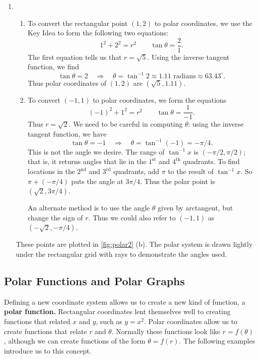 {\begin{enumerate}
	\item \begin{enumerate}
		\item To convert the rectangular point $(1,2)$ to polar coordinates, we use the Key Idea to form the following two equations:
		$$1^2+2^2 = r^2 \qquad \tan \theta = \frac{2}{1}.$$
		The first equation tells us that $r=\sqrt{5}$. Using the inverse tangent function, we find
		$$\tan \theta = 2 \quad \Rightarrow \quad \theta = \tan^{-1} 2 \approx 1.11\text{ radians}\approx 63.43^\circ.$$
		Thus polar coordinates of $(1,2)$ are $(\sqrt{5},1.11)$.
		\item		To convert $(-1,1)$ to polar coordinates, we form the equations 
		$$(-1)^2+1^2=r^2 \qquad \tan \theta = \frac{1}{-1}.$$
		Thus $r=\sqrt{2}$. We need to be careful in computing $\theta$: using the inverse tangent function, we have $$\tan\theta = -1 \quad \Rightarrow \quad \theta = \tan^{-1}(-1) = -\pi/4.$$
		This is not the angle we desire. The range of $\tan^{-1}x $ is $(-\pi/2,\pi/2)$; that is, it returns angles that lie in the $1^\text{st}$ and $4^\text{th}$ quadrants. To find locations in the $2^\text{nd}$  and $3^\text{rd}$ quadrants, add $\pi$ to the result of $\tan^{-1}x$. So  $\pi+(-\pi/4)$ puts the angle at $3\pi/4$. Thus the polar point is $(\sqrt{2},3\pi/4)$.
		
		An alternate method is to use the angle $\theta$ given by arctangent, but change the sign of $r$. Thus we could also refer to $(-1,1)$ as\\ $(-\sqrt{2},-\pi/4)$.
	\end{enumerate}
These points are plotted in \autoref{fig:polar2} (b). The polar system is drawn lightly under the rectangular grid with rays to demonstrate the angles used.\eoehere
\end{enumerate}}

\subsection*{Polar Functions and Polar Graphs}

Defining a new coordinate system allows us to create a new kind of function, a \textbf{polar function.} Rectangular coordinates lent themselves well to creating functions that related $x$ and $y$, such as $y=x^2.$ Polar coordinates allow us to create functions that relate $r$ and $\theta$. Normally these functions look like $r=f(\theta)$, although we can create functions of the form $\theta = f(r)$. The following examples introduce us to this concept.

